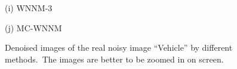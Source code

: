\documentclass[10pt,onecolumn,letterpaper]{article}
\begin{document}
\begin{figure}
{\begin{minipage}[t]{0.2\textwidth}
\centering
{}
{\footnotesize (i) WNNM-3 \cite{wnnm}   }
\end{minipage}
\begin{minipage}[t]{0.2\textwidth}
\centering
{}
{\footnotesize (j) MC-WNNM  }
\end{minipage}
}
\vspace{-2mm}
\caption{Denoised images of the real noisy image ``Vehicle'' \cite{ncwebsite} by different methods.\ The images are better to be zoomed in on screen.}
\label{f3}
\vspace{-2mm}
\end{figure}
\end{document}
